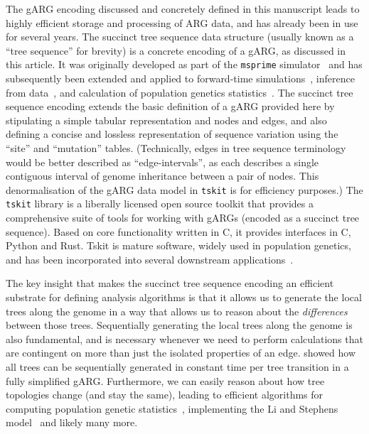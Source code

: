 \documentclass{article}
\begin{document}
The gARG encoding discussed and concretely defined in this manuscript
leads to highly efficient storage and processing of ARG data,
and has already been in use for several years.
The succinct tree sequence data structure (usually known as a ``tree sequence''
for brevity)
is a concrete encoding of a gARG, as discussed in this article.
It was originally developed as part of the \texttt{msprime}
simulator~\citep{kelleher2016efficient} and has subsequently been
extended and applied to forward-time
simulations~\citep{kelleher2018efficient,haller2018tree},
inference from data~\citep{kelleher2019inferring,wohns2022unified},
and calculation of population genetics statistics~\citep{ralph2020efficiently}.
The succinct tree sequence encoding extends the basic definition
of a gARG provided here by stipulating a
simple tabular representation and nodes and edges,
and also defining a concise and lossless representation of
sequence variation using the ``site'' and  ``mutation'' tables.
(Technically, edges in tree sequence terminology would be better
described as ``edge-intervals'', as each describes a single contiguous
interval of genome inheritance between a pair of nodes. This
denormalisation of the gARG data model in \texttt{tskit} is for efficiency purposes.)
The \texttt{tskit} library is a liberally
licensed open source toolkit that provides a comprehensive suite
of tools for working with gARGs (encoded as a succinct tree sequence).
Based on core functionality written
in C, it provides interfaces in C, Python and Rust.
Tskit is mature software, widely used in population genetics, and
has been incorporated into several downstream
applications~\citep[e.g.,][]{haller2019slim,speidel2019method,
adrion2020community,
terasaki2021geonomics,
baumdicker2021efficient,
fan2022genealogical,korfmann2022weak,
mahmoudi2022bayesian,petr2022slendr,rasmussen2022espalier,
zhang2023biobank,nowbandegani2023extremely,ignatieva2023distribution}.

The key insight that makes the succinct tree sequence encoding
an efficient substrate for defining analysis algorithms is that
it allows us to generate the local trees along the genome
in a way that allows us to reason about the \emph{differences}
between those trees.
Sequentially generating the local trees along the genome
is also fundamental, and is necessary whenever we need to
perform calculations that are contingent on more than just the
isolated properties of an edge. \cite{kelleher2016efficient}
showed how all trees can be sequentially generated in
constant time per tree transition in a fully simplified gARG.
Furthermore, we can easily reason about how tree topologies
change (and stay the same), leading to efficient algorithms
for computing population genetic
statistics~\citep{kelleher2016efficient,ralph2020efficiently},
implementing the Li and Stephens
model~\citep{kelleher2019inferring,wohns2022unified}
and likely many more.
\end{document}
